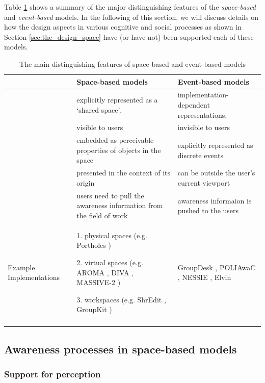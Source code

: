 Table \ref{tab:awareness_models} shows a summary of the major distinguishing features of the \emph{space-based} and \emph{event-based} models. In the following of this section, we will discuss details on how the design aspects in various cognitive and social processes as shown in Section \ref{sec:the_design_space} have (or have not) been supported each of these models.

{\footnotesize
\begin{longtable}{>{\raggedright}p{1.1in}>{\raggedright}p{2.2in}>{\raggedright}p{2.2in}}
\toprule 
 & \textbf{Space-based models} & \textbf{Event-based models}\tabularnewline
\midrule 
\multirow{2}{1.1in}{Field of work} & explicitly represented as a `shared space',  & implementation-dependent representations, \tabularnewline
\cmidrule{2-3} 
 & visible to users & invisible to users\tabularnewline
\midrule 
\multirow{3}{1.1in}{Awareness information} & embedded as perceivable properties of objects in the space & explicitly represented as discrete events\tabularnewline
\cmidrule{2-3} 
 & presented in the context of its origin & can be outside the user's current viewport\tabularnewline
\cmidrule{2-3} 
 & users need to pull the awareness information from the field of work & awareness informaion is pushed to the users\tabularnewline
\midrule 
Example Implementations & 1. physical spaces (e.g. Portholes \cite{Dourish1992})

2. virtual spaces (e.g. AROMA \cite{Pedersen1997},
DIVA \cite{Berlage1999}, MASSIVE-2 \cite{Benford2001})

3. workspaces (e.g. ShrEdit \cite{dourish1992awareness},
GroupKit \cite{Roseman1996}) & GroupDesk \cite{Fuchs1995}, POLIAwaC \cite{sohlenkamp2000po},
NESSIE \cite{prinz1999a}, Elvin \cite{Fitzpatrick2002}\tabularnewline
\bottomrule

\caption{The main distinguishing features of space-based and event-based models}
\label{tab:awareness_models}
\end{longtable}
}

\subsection{Awareness processes in space-based models} %
\label{sub:awareness_processes_in_space_based_models}
\subsubsection{Support for perception} %
\label{ssub:support_for_perception}

